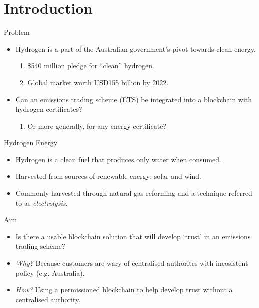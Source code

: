 \section{Introduction}
\begin{frame}{Problem}
    \begin{itemize}
        \item Hydrogen is a part of the Australian government's pivot towards
              clean energy.
              \begin{enumerate}[i]
                  \item \$540 million pledge for ``clean'' hydrogen.
                  \item Global market worth USD155 billion by 2022.
              \end{enumerate}
        \item Can an emissions trading scheme (ETS) be integrated into a
              blockchain with hydrogen certificates?
              \begin{enumerate}
                  \item Or more generally, for any energy certificate?
              \end{enumerate}
    \end{itemize}
\end{frame}

\begin{frame}{Hydrogen Energy}
    \begin{itemize}
        \item Hydrogen is a clean fuel that produces only water when consumed.
        \item Harvested from sources of renewable energy: solar and wind.
        \item Commonly harvested through natural gas reforming and a
              technique referred to as \textit{electrolysis}.
    \end{itemize}
\end{frame}

\begin{frame}{Aim}
    \begin{itemize}
        \item Is there a usable blockchain solution that will develop
              `trust' in an emissions trading scheme?
        \item \textit{Why?} Because customers are wary of centralised
              authorites with incosistent policy (e.g. Australia).
        \item \textit{How?} Using a permissioned blockchain to help
              develop trust without a centralised authority.
    \end{itemize}
\end{frame}